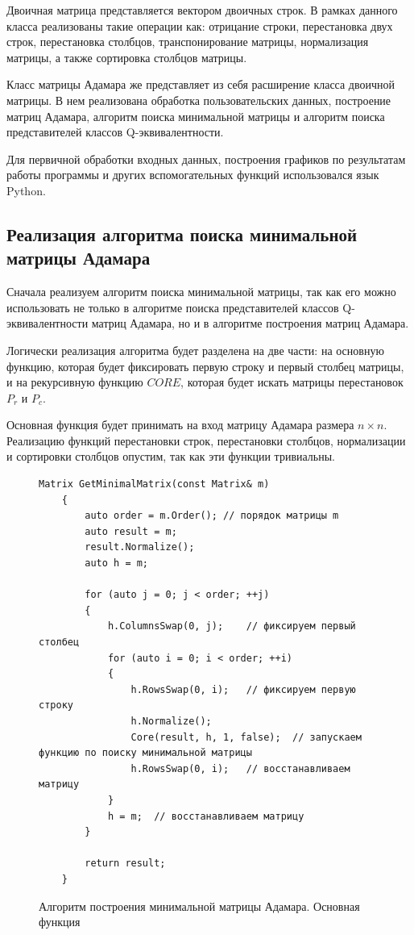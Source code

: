\documentclass[a4paper, 14pt]{extreport}
\begin{document}
Двоичная матрица представляется вектором двоичных строк. В рамках данного класса реализованы такие операции как: отрицание строки, перестановка двух строк, перестановка столбцов, транспонирование матрицы, нормализация матрицы, а также сортировка столбцов матрицы.

Класс матрицы Адамара же представляет из себя расширение класса двоичной матрицы. В нем реализована обработка пользовательских данных, построение матриц Адамара, алгоритм поиска минимальной матрицы и алгоритм поиска представителей классов Q-эквивалентности.

Для первичной обработки входных данных, построения графиков по результатам работы программы и других вспомогательных функций использовался язык Python.

\subsection{Реализация алгоритма поиска минимальной матрицы Адамара}
\label{mm_finder_s}

Сначала реализуем алгоритм поиска минимальной матрицы, так как его можно использовать не только в алгоритме поиска представителей классов Q-эквивалентности матриц Адамара, но и в алгоритме построения матриц Адамара.

Логически реализация алгоритма будет разделена на две части: на основную функцию, которая будет фиксировать первую строку и первый столбец матрицы, и на рекурсивную функцию $CORE$, которая будет искать матрицы перестановок $P_r$ и $P_c$.

Основная функция будет принимать на вход матрицу Адамара размера $n \times n$. Реализацию функций перестановки строк, перестановки столбцов, нормализации и сортировки столбцов опустим, так как эти функции тривиальны.

\begin{figure}[H]
    \centering
    \begin{minipage}{\linewidth}
    \begin{lstlisting}[language=С++, tabsize=4, showspaces=false, basicstyle=\fontsize{9.5}{11.5}\selectfont, numbers=none]
    Matrix GetMinimalMatrix(const Matrix& m)
    {
        auto order = m.Order(); // порядок матрицы m
        auto result = m;
        result.Normalize();
        auto h = m;
    
        for (auto j = 0; j < order; ++j)
        {
            h.ColumnsSwap(0, j);    // фиксируем первый столбец
            for (auto i = 0; i < order; ++i)
            {
                h.RowsSwap(0, i);   // фиксируем первую строку
                h.Normalize();
                Core(result, h, 1, false);  // запускаем функцию по поиску минимальной матрицы
                h.RowsSwap(0, i);   // восстанавливаем матрицу
            }
            h = m;  // восстанавливаем матрицу
        }
    
        return result;
    }
    \end{lstlisting}
    \end{minipage}
    \caption{Алгоритм построения минимальной матрицы Адамара. Основная функция}
    \label{alg:mm_finder_main}
\end{figure}
\end{document}
